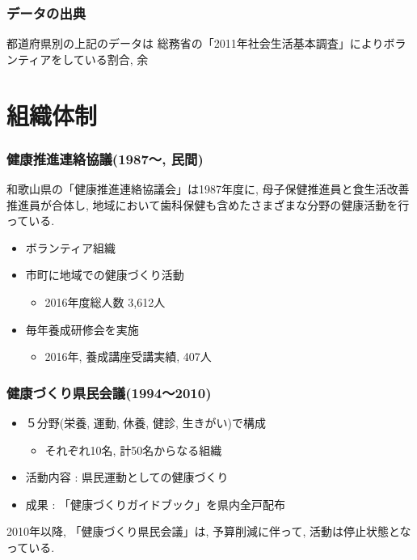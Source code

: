 \subsection{データの出典}
都道府県別の上記のデータは
総務省の「2011年社会生活基本調査」によりボランティアをしている割合, 余



\chapter{組織体制}
\subsection{健康推進連絡協議(1987〜, 民間)}
和歌山県の「健康推進連絡協議会」は1987年度に, 母子保健推進員と食生活改善推進員が合体し, 地域において歯科保健も含めたさまざまな分野の健康活動を行っている.
\begin{itemize} \setlength{\itemsep}{-0.5mm} \setlength{\parskip}{-0.5mm}

	\item  ボランティア組織
	\item  市町に地域での健康づくり活動
	      \begin{itemize} \setlength{\itemsep}{-0.5mm} \setlength{\parskip}{-0.5mm}
		      \item 2016年度総人数 3,612人
	      \end{itemize}
	\item  毎年養成研修会を実施
	      \begin{itemize} \setlength{\itemsep}{-0.5mm} \setlength{\parskip}{-0.5mm}
		      \item 2016年, 養成講座受講実績, 407人
	      \end{itemize}
\end{itemize}

\subsection{健康づくり県民会議(1994〜2010)}
\begin{itemize} \setlength{\itemsep}{-0.5mm} \setlength{\parskip}{-0.5mm}
	\item ５分野(栄養, 運動, 休養, 健診, 生きがい)で構成
	      \begin{itemize} \setlength{\itemsep}{-0.5mm} \setlength{\parskip}{-0.5mm}
		      \item それぞれ10名, 計50名からなる組織
	      \end{itemize}
	\item 活動内容 : 県民運動としての健康づくり
	\item 成果 : 「健康づくりガイドブック」を県内全戸配布
\end{itemize}
2010年以降, 「健康づくり県民会議」は, 予算削減に伴って, 活動は停止状態となっている.

